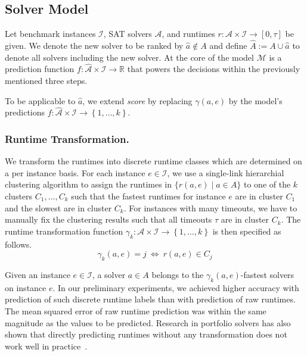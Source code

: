 \documentclass[runningheads]{llncs}
\begin{document}
\subsection{Solver Model}
\label{sec:main-model}



Let benchmark instances $\mathcal{I}$, SAT solvers $\mathcal{A}$, and runtimes $r : \mathcal{A} \times \mathcal{I} \rightarrow \left[0, \tau\right]$ be given. 
We denote the new solver to be ranked by $\hat a \not\in A$ and define $\hat A := A \cup \hat a$ to denote all solvers including the new solver. 
At the core of the model $\mathcal{M}$ is a prediction function $f : \mathcal{\hat A} \times \mathcal{I} \rightarrow \mathbb{R}$ that powers the decisions within the previously mentioned three steps.

To be applicable to $\hat{a}$, we extend \emph{score} by replacing $\gamma(a, e)$ by the model's predictions $f : \mathcal{\hat A} \times \mathcal{I} \rightarrow \left\lbrace 1, \dots, k \right\rbrace$.


\subsubsection{Runtime Transformation.}

We transform the runtimes into discrete runtime classes which are determined on a per instance basis.
For each instance $e \in \mathcal{I}$, we use a single-link hierarchial clustering algorithm to assign the runtimes in $\bigl\{ r(a, e) \mid a \in A \bigr\}$ to one of the $k$ clusters $C_1, \dots, C_k$ such that the fastest runtimes for instance $e$ are in cluster $C_1$ and the slowest are in cluster $C_k$.
For instances with many timeouts, we have to manually fix the clustering results such that all timeouts $\tau$ are in cluster $C_k$.
The runtime transformation function $\gamma_k : {\mathcal{A} \times \mathcal{I}} \rightarrow \left\lbrace 1, \dots, k \right\rbrace$ is then specified as follows.
$$\gamma_k(a, e) = j ~\Leftrightarrow~ r(a, e) \in C_j$$

Given an instance $e \in \mathcal{I}$, a solver $a \in A$ belongs to the $\gamma_k(a, e)$-fastest solvers on instance $e$. 
In our preliminary experiments, we achieved higher accuracy with prediction of such discrete runtime labels than with prediction of raw runtimes. 
The mean squared error of raw runtime prediction was within the same magnitude as the values to be predicted. 
Research in portfolio solvers has also shown that directly predicting runtimes without any transformation does not work well in practice~\cite{NgokoCT19,CollauttiMMO13}.
\end{document}
